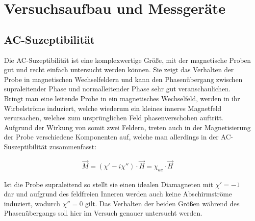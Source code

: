 \section{Versuchsaufbau und Messgeräte}
\subsection{AC-Suzeptibilität}
Die AC-Suzeptibilität ist eine komplexwertige Größe, mit der magnetische Proben gut und recht einfach untersucht werden können. Sie zeigt das Verhalten der Probe in magnetischen Wechselfeldern und kann den Phasenübergang zwischen supraleitender Phase und normalleitender Phase sehr gut veranschaulichen. Bringt man eine leitende Probe in ein magnetisches Wechselfeld, werden in ihr Wirbelströme induziert, welche wiederum ein kleines inneres Magnetfeld verursachen, welches zum ursprünglichen Feld phasenverschoben auftritt. Aufgrund der Wirkung von somit zwei Feldern, treten auch in der Magnetisierung der Probe verschiedene Komponenten auf, welche man allerdings in der AC-Suszeptibilität zusammenfasst:

\begin{align}
\overrightarrow{M}=\left(\chi' - i\chi ''\right)\cdot \overrightarrow{H}=\chi_{ac} \cdot \overrightarrow{H}
\end{align}

Ist die Probe supraleitend so stellt sie einen idealen Diamagneten mit $\chi'=-1$ dar und aufgrund des feldfreien Inneren werden auch keine Abschirmströme induziert, wodurch $\chi'' =0$ gilt. Das Verhalten der beiden Größen während des Phasenübergangs soll hier im Versuch genauer untersucht werden.

